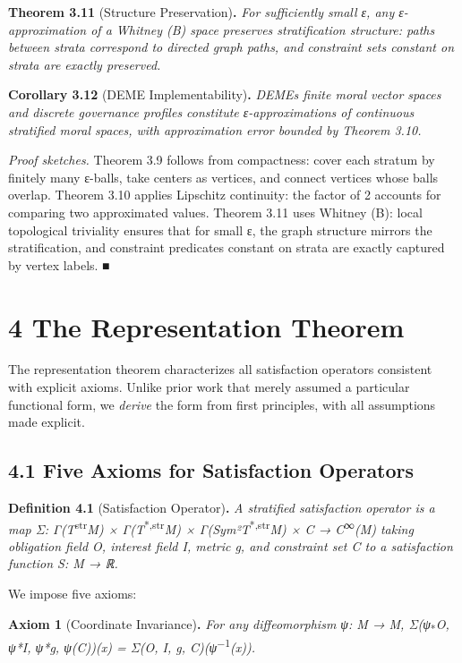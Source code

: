 \documentclass[12pt]{article}
\theoremstyle{plain}
\theoremstyle{definition}
\theoremstyle{remark}
\begin{document}
\textbf{Theorem 3.11} (Structure Preservation)\textbf{.} \emph{For
sufficiently small ε, any ε-approximation of a Whitney (B) space
preserves stratification structure: paths between strata correspond to
directed graph paths, and constraint sets constant on strata are exactly
preserved.}

\textbf{Corollary 3.12} (DEME Implementability)\textbf{.}
\emph{DEME\textquotesingle s finite moral vector spaces and discrete
governance profiles constitute ε-approximations of continuous stratified
moral spaces, with approximation error bounded by Theorem 3.10.}

\emph{Proof sketches.} Theorem 3.9 follows from compactness: cover each
stratum by finitely many ε-balls, take centers as vertices, and connect
vertices whose balls overlap. Theorem 3.10 applies Lipschitz continuity:
the factor of 2 accounts for comparing two approximated values. Theorem
3.11 uses Whitney (B): local topological triviality ensures that for
small ε, the graph structure mirrors the stratification, and constraint
predicates constant on strata are exactly captured by vertex labels. ■

\section{4 The Representation Theorem}\label{the-representation-theorem}

The representation theorem characterizes all satisfaction operators
consistent with explicit axioms. Unlike prior work that merely assumed a
particular functional form, we \emph{derive} the form from first
principles, with all assumptions made explicit.

\subsection{4.1 Five Axioms for Satisfaction
Operators}\label{five-axioms-for-satisfaction-operators}

\textbf{Definition 4.1} (Satisfaction Operator)\textbf{.} \emph{A
stratified satisfaction operator is a map Σ:
Γ(T}\textsuperscript{str}\emph{M) × Γ(T}\textsuperscript{*,str}\emph{M)
× Γ(Sym²T}\textsuperscript{*,str}\emph{M) × C →
C}\textsuperscript{∞}\emph{(M) taking obligation field O, interest field
I, metric g, and constraint set C to a satisfaction function S: M → ℝ.}

We impose five axioms:

\textbf{Axiom 1} (Coordinate Invariance)\textbf{.} \emph{For any
diffeomorphism ψ: M → M, Σ(ψ}\textsubscript{*}\emph{O, ψ*I, ψ*g,
ψ(C))(x) = Σ(O, I, g, C)(ψ}\textsuperscript{−1}\emph{(x)).}
\end{document}
